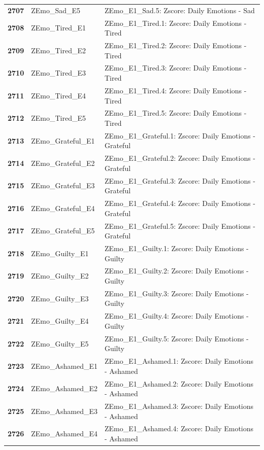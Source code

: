 \documentclass[
  letterpaper,
  DIV=11,
  numbers=noendperiod]{scrartcl}
\begin{document}
\begin{longtable}[t]{>{}cll}
\textbf{2707} & ZEmo\_Sad\_E5 & ZEmo\_E1\_Sad.5: Zscore:  Daily Emotions - Sad\\
\textbf{2708} & ZEmo\_Tired\_E1 & ZEmo\_E1\_Tired.1: Zscore:  Daily Emotions - Tired\\
\textbf{2709} & ZEmo\_Tired\_E2 & ZEmo\_E1\_Tired.2: Zscore:  Daily Emotions - Tired\\
\textbf{2710} & ZEmo\_Tired\_E3 & ZEmo\_E1\_Tired.3: Zscore:  Daily Emotions - Tired\\
\addlinespace
\textbf{2711} & ZEmo\_Tired\_E4 & ZEmo\_E1\_Tired.4: Zscore:  Daily Emotions - Tired\\
\textbf{2712} & ZEmo\_Tired\_E5 & ZEmo\_E1\_Tired.5: Zscore:  Daily Emotions - Tired\\
\textbf{2713} & ZEmo\_Grateful\_E1 & ZEmo\_E1\_Grateful.1: Zscore:  Daily Emotions - Grateful\\
\textbf{2714} & ZEmo\_Grateful\_E2 & ZEmo\_E1\_Grateful.2: Zscore:  Daily Emotions - Grateful\\
\textbf{2715} & ZEmo\_Grateful\_E3 & ZEmo\_E1\_Grateful.3: Zscore:  Daily Emotions - Grateful\\
\addlinespace
\textbf{2716} & ZEmo\_Grateful\_E4 & ZEmo\_E1\_Grateful.4: Zscore:  Daily Emotions - Grateful\\
\textbf{2717} & ZEmo\_Grateful\_E5 & ZEmo\_E1\_Grateful.5: Zscore:  Daily Emotions - Grateful\\
\textbf{2718} & ZEmo\_Guilty\_E1 & ZEmo\_E1\_Guilty.1: Zscore:  Daily Emotions - Guilty\\
\textbf{2719} & ZEmo\_Guilty\_E2 & ZEmo\_E1\_Guilty.2: Zscore:  Daily Emotions - Guilty\\
\textbf{2720} & ZEmo\_Guilty\_E3 & ZEmo\_E1\_Guilty.3: Zscore:  Daily Emotions - Guilty\\
\addlinespace
\textbf{2721} & ZEmo\_Guilty\_E4 & ZEmo\_E1\_Guilty.4: Zscore:  Daily Emotions - Guilty\\
\textbf{2722} & ZEmo\_Guilty\_E5 & ZEmo\_E1\_Guilty.5: Zscore:  Daily Emotions - Guilty\\
\textbf{2723} & ZEmo\_Ashamed\_E1 & ZEmo\_E1\_Ashamed.1: Zscore:  Daily Emotions - Ashamed\\
\textbf{2724} & ZEmo\_Ashamed\_E2 & ZEmo\_E1\_Ashamed.2: Zscore:  Daily Emotions - Ashamed\\
\textbf{2725} & ZEmo\_Ashamed\_E3 & ZEmo\_E1\_Ashamed.3: Zscore:  Daily Emotions - Ashamed\\
\addlinespace
\textbf{2726} & ZEmo\_Ashamed\_E4 & ZEmo\_E1\_Ashamed.4: Zscore:  Daily Emotions - Ashamed\\

\end{longtable}
\end{document}

